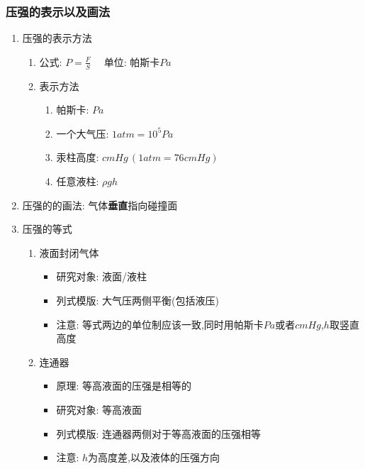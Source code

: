 \documentclass{article}
\begin{document}
\vspace{1em}

\subsubsection{压强的表示以及画法}
\begin{enumerate}
    \item 压强的表示方法
          \begin{enumerate}[label = (\arabic*)]
              \item 公式: $P = \frac{F}{S} \quad $ 单位: 帕斯卡$Pa$
              \item 表示方法
                    \begin{enumerate}
                        \item 帕斯卡: $Pa$
                        \item 一个大气压: $1atm = 10^{5}Pa$
                        \item 汞柱高度: $cmHg \,  (1atm = 76cmHg)$
                        \item 任意液柱: $\rho gh$
                    \end{enumerate}
          \end{enumerate}
    \item 压强的的画法: 气体\textbf{垂直}指向碰撞面
    \item 压强的等式
          \begin{enumerate}[label = (\arabic*)]
              \item 液面封闭气体
                    \begin{itemize}
                        \item 研究对象: 液面/液柱
                        \item 列式模版: 大气压两侧平衡(包括液压)
                        \item 注意: 等式两边的单位制应该一致,同时用帕斯卡$Pa$或者$cmHg$,$h$取竖直高度
                    \end{itemize}
              \item 连通器
                    \begin{itemize}
                        \item 原理: 等高液面的压强是相等的
                        \item 研究对象: 等高液面
                        \item 列式模版: 连通器两侧对于等高液面的压强相等
                        \item 注意: $h$为高度差,以及液体的压强方向

\end{itemize}
\end{enumerate}
\end{enumerate}
\end{document}
